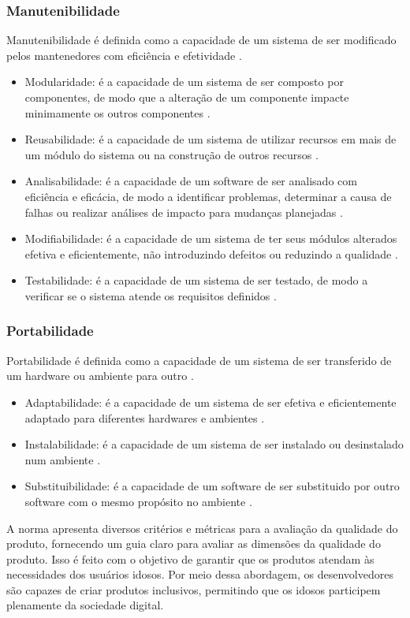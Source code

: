 \subsubsection{Manutenibilidade}

Manutenibilidade é definida como a capacidade de um sistema de ser modificado pelos mantenedores com eficiência e efetividade .

\begin{itemize}
    \item Modularidade: é a capacidade de um sistema de ser composto por componentes, de modo que a alteração de um componente impacte minimamente os outros componentes .
    \item Reusabilidade: é a capacidade de um sistema de utilizar recursos em mais de um módulo do sistema ou na construção de outros recursos .
    \item Analisabilidade: é a capacidade de um software de ser analisado com eficiência e eficácia, de modo a identificar problemas, determinar a causa de falhas ou realizar análises de impacto para mudanças planejadas .
    \item Modifiabilidade: é a capacidade de um sistema de ter seus módulos alterados efetiva e eficientemente, não introduzindo defeitos ou reduzindo a qualidade .
    \item Testabilidade: é a capacidade de um sistema de ser testado, de modo a verificar se o sistema atende os requisitos definidos .
\end{itemize}

\subsubsection
{Portabilidade}

Portabilidade é definida como a capacidade de um sistema de ser transferido de um hardware ou ambiente para outro .

\begin{itemize}
    \item Adaptabilidade: é a capacidade de um sistema de ser efetiva e eficientemente adaptado para diferentes hardwares e ambientes .
    \item Instalabilidade: é a capacidade de um sistema de ser instalado ou desinstalado num ambiente .
    \item Substituibilidade: é a capacidade de um software de ser substituido por outro software com o mesmo propósito no ambiente .
\end{itemize}

A norma  apresenta diversos critérios e métricas para a avaliação da qualidade do produto, fornecendo um guia claro para avaliar as dimensões da qualidade do produto. Isso é feito com o objetivo de garantir que os produtos atendam às necessidades dos usuários idosos. Por meio dessa abordagem, os desenvolvedores são capazes de criar produtos inclusivos, permitindo que os idosos participem plenamente da sociedade digital.
